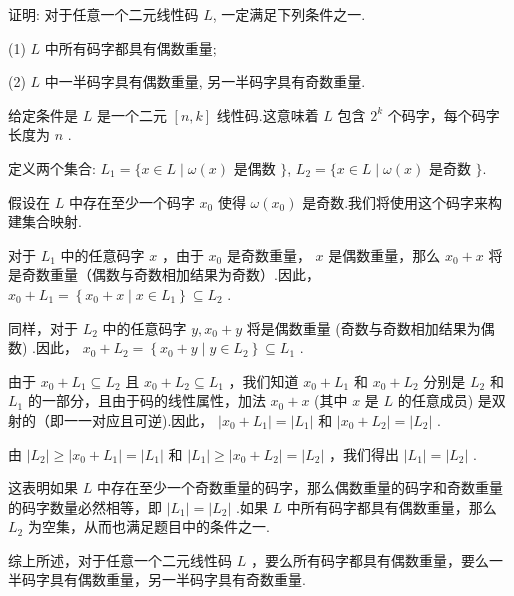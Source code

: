    \begin{tcolorbox}[breakable,colback=blue!5!white,colframe=blue!75!black,
 title= 解答题]

 证明: 对于任意一个二元线性码 $ L $, 一定满足下列条件之一.
 
(1) $L$ 中所有码字都具有偶数重量;

(2) $ L $ 中一半码字具有偶数重量, 另一半码字具有奇数重量.
\tcblower

给定条件是 $ L $ 是一个二元 $ [n, k] $ 线性码.这意味着 $ L $ 包含 $ 2^{k} $ 个码字，每个码字长度为 $ n $ .

定义两个集合: $ L_{1}=\{x \in L \mid \omega(x) $ 是偶数 $ \} $, $ L_{2}=\{x \in L \mid \omega(x) $ 是奇数 $ \} $.

假设在 $ L $ 中存在至少一个码字 $ x_{0} $ 使得 $ \omega\left(x_{0}\right) $ 是奇数.我们将使用这个码字来构建集合映射.

对于 $ L_{1} $ 中的任意码字 $ x $ ，由于 $ x_{0} $ 是奇数重量， $ x $ 是偶数重量，那么 $ x_{0}+x $ 将是奇数重量（偶数与奇数相加结果为奇数）.因此， $ x_{0}+L_{1}=\left\{x_{0}+x \mid x \in L_{1}\right\} \subseteq L_{2} $ .

同样，对于 $ L_{2} $ 中的任意码字 $ y, x_{0}+y $ 将是偶数重量 (奇数与奇数相加结果为偶数) .因此， $ x_{0}+L_{2}=\left\{x_{0}+y \mid y \in L_{2}\right\} \subseteq L_{1} $ .


由于 $ x_{0}+L_{1} \subseteq L_{2} $ 且 $ x_{0}+L_{2} \subseteq L_{1} $ ，我们知道 $ x_{0}+L_{1} $ 和 $ x_{0}+L_{2} $ 分别是 $ L_{2} $ 和 $ L_{1} $ 的一部分，且由于码的线性属性，加法 $ x_{0}+x $ (其中 $ x $ 是 $ L $ 的任意成员) 是双射的（即一一对应且可逆).因此， $ \left|x_{0}+L_{1}\right|=\left|L_{1}\right| $ 和 $ \left|x_{0}+L_{2}\right|=\left|L_{2}\right| $ .

由 $ \left|L_{2}\right| \geq\left|x_{0}+L_{1}\right|=\left|L_{1}\right| $ 和 $ \left|L_{1}\right| \geq\left|x_{0}+L_{2}\right|=\left|L_{2}\right| $ ，我们得出 $ \left|L_{1}\right|=\left|L_{2}\right| $ .

这表明如果 $ L $ 中存在至少一个奇数重量的码字，那么偶数重量的码字和奇数重量的码字数量必然相等，即 $ \left|L_{1}\right|=\left|L_{2}\right| $ .如果 $ L $ 中所有码字都具有偶数重量，那么 $ L_{2} $ 为空集，从而也满足题目中的条件之一.

综上所述，对于任意一个二元线性码 $ L $ ，要么所有码字都具有偶数重量，要么一半码字具有偶数重量，另一半码字具有奇数重量.

 \end{tcolorbox}